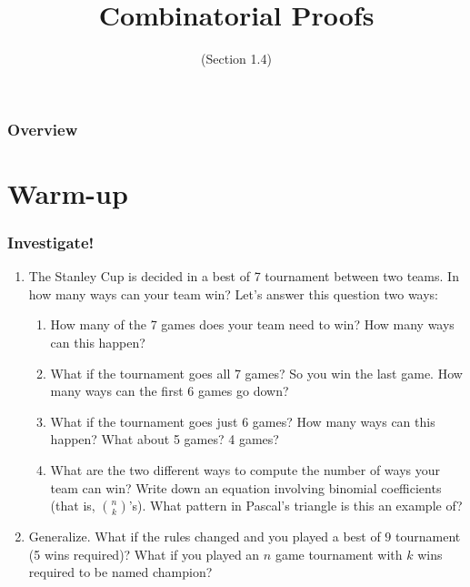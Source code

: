 \documentclass[11pt, compress]{beamer}
\title{Combinatorial Proofs}
\subtitle{(Section 1.4)}
\author{}
\date[]{}
\begin{document}
\begin{frame}
\maketitle 
\end{frame}
 
\begin{frame}
\frametitle{Overview}
\tableofcontents 
\end{frame}
 

\section{Warm-up}
\begin{frame}
\frametitle{Investigate!}
 \begin{enumerate}
\item{} The Stanley Cup is decided in a best of 7 tournament between two teams. In how many ways can your team win? Let's answer this question two ways:\begin{enumerate}
\item{} How many of the 7 games does your team need to win? How many ways can this happen?


\item{} What if the tournament goes all 7 games? So you win the last game. How many ways can the first 6 games go down?


\item{} What if the tournament goes just 6 games? How many ways can this happen? What about 5 games? 4 games?


\item{} What are the two different ways to compute the number of ways your team can win? Write down an equation involving binomial coefficients (that is, \({n \choose k}\)'s). What pattern in Pascal's triangle is this an example of?

\end{enumerate}



\item{} Generalize. What if the rules changed and you played a best of \(9\) tournament (5 wins required)? What if you played an \(n\) game tournament with \(k\) wins required to be named champion?

\end{enumerate}

\end{frame}
 
\end{document}
